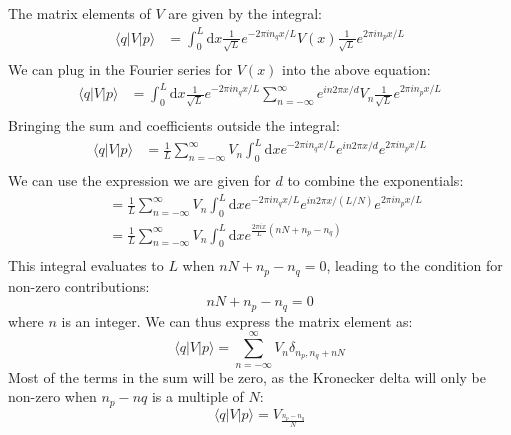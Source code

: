 \documentclass[12pt]{article}
\begin{document}
\subsection{}
The matrix elements of $V$ are given by the integral:
\begin{equation}
  \begin{aligned}
    \langle q|V| p\rangle &=\int_{0}^{L} \mathrm{d} x \frac{1}{\sqrt{L}} e^{-2 \pi i n_{q} x / L} V(x) \frac{1}{\sqrt{L}} e^{2 \pi i n_{p} x / L} \\
\end{aligned}
\end{equation}
We can plug in the Fourier series for $V(x)$ into the above equation:
\begin{equation}
  \begin{aligned}
    \langle q|V| p\rangle &=\int_{0}^{L} \mathrm{d} x \frac{1}{\sqrt{L}} e^{-2 \pi i n_{q} x / L} \sum_{n=-\infty}^{\infty} e^{i n 2 \pi x / d} V_{n} \frac{1}{\sqrt{L}} e^{2 \pi i n_{p} x / L} \\
\end{aligned}
\end{equation}
Bringing the sum and coefficients outside the integral:
\begin{equation}
  \begin{aligned}
    \langle q|V| p\rangle &=\frac{1}{L}\sum_{n=-\infty}^{\infty} V_{n}\int_{0}^{L} \mathrm{d} x e^{-2 \pi i n_{q} x / L} e^{i n 2 \pi x / d} e^{2 \pi i n_{p} x / L} \\
\end{aligned}
\end{equation}
We can use the expression we are given for $d$ to combine the exponentials:
\begin{equation}
  \begin{aligned}
    &=\frac{1}{L}\sum_{n=-\infty}^{\infty} V_{n}\int_{0}^{L} \mathrm{d} x e^{-2 \pi i n_{q} x / L} e^{i n 2 \pi x / (L/N)} e^{2 \pi i n_{p} x / L} \\
    &=\frac{1}{L}\sum_{n=-\infty}^{\infty} V_{n}\int_{0}^{L} \mathrm{d} x e^{\frac{2\pi i x}{L}\left( nN+n_{p}-n_{q}\right)}\\
\end{aligned}
\end{equation}
This integral evaluates to $L$ when $nN + n_{p} - n_{q} = 0$, leading to the condition for non-zero contributions:
\begin{equation}
  nN + n_{p} - n_{q} = 0
\end{equation}
where $n$ is an integer.
We can thus express the matrix element as:
\begin{equation}
  \langle q|V| p\rangle = \sum_{n=-\infty}^{\infty} V_{n} \delta_{n_{p}, n_{q} + nN}
\end{equation}
Most of the terms in the sum will be zero, as the Kronecker delta will only be non-zero when $n_{p}-n{q}$ is a multiple of $N$:
\begin{equation}
  \langle q|V| p\rangle = V_{\frac{n_{p}-n_{q}}{N}}
\end{equation}
\end{document}
